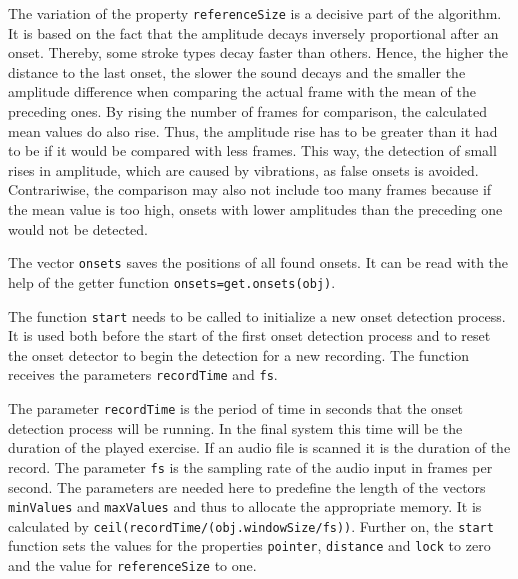 The variation of the property \lstinline{referenceSize} is a decisive part of the algorithm. It is based on the fact that the amplitude decays inversely proportional after an onset. Thereby, some stroke types decay faster than others. Hence, the higher the distance to the last onset, the slower the sound decays and the smaller the amplitude difference when comparing the actual frame with the mean of the preceding ones. By rising the number of frames for comparison, the calculated mean values do also rise. Thus, the amplitude rise has to be greater than it had to be if it would be compared with less frames. This way, the detection of small rises in amplitude, which are caused by vibrations, as false onsets is avoided. Contrariwise, the comparison may also not include too many frames because if the mean value is too high, onsets with lower amplitudes than the preceding one would not be detected.

The vector \lstinline{onsets} saves the positions of all found onsets. It can be read with the help of the  getter function \lstinline{onsets=get.onsets(obj)}.

The function \lstinline{start} needs to be called to initialize a new onset detection process. It is used both before the start of the first onset detection process and to reset the onset detector to begin the detection for a new recording. The function receives the parameters \lstinline{recordTime} and \lstinline{fs}. 

The parameter \lstinline{recordTime} is the period of time in seconds that the onset detection process will be running. In the final system this time will be the duration of the played exercise. If an audio file is scanned it is the duration of the record. The parameter \lstinline{fs} is the sampling rate of the audio input in frames per second. The parameters are needed here to predefine the length of the vectors \lstinline{minValues} and \lstinline{maxValues} and thus to allocate the appropriate memory. It is calculated by \lstinline{ceil(recordTime/(obj.windowSize/fs))}. Further on, the \lstinline{start} function sets the values for the properties \lstinline{pointer}, \lstinline{distance} and \lstinline{lock} to zero and the value for \lstinline{referenceSize} to one. 

